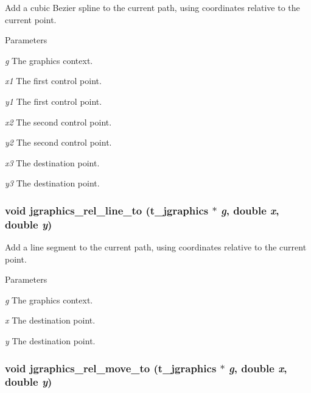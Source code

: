 Add a cubic Bezier spline to the current path, using coordinates relative to the current point. 
\begin{DoxyParams}{Parameters}
\item[{\em g}]The graphics context. \item[{\em x1}]The first control point. \item[{\em y1}]The first control point. \item[{\em x2}]The second control point. \item[{\em y2}]The second control point. \item[{\em x3}]The destination point. \item[{\em y3}]The destination point. \end{DoxyParams}
\hypertarget{group__jgraphics_ga0669af2caff03efea7fab31484ad62eb}{
\subsubsection[{jgraphics\_\-rel\_\-line\_\-to}]{\setlength{\rightskip}{0pt plus 5cm}void jgraphics\_\-rel\_\-line\_\-to ({\bf t\_\-jgraphics} $\ast$ {\em g}, \/  double {\em x}, \/  double {\em y})}}
\label{group__jgraphics_ga0669af2caff03efea7fab31484ad62eb}


Add a line segment to the current path, using coordinates relative to the current point. 
\begin{DoxyParams}{Parameters}
\item[{\em g}]The graphics context. \item[{\em x}]The destination point. \item[{\em y}]The destination point. \end{DoxyParams}
\hypertarget{group__jgraphics_ga1d3d4ea2e22dcb02098f1f24ff937296}{
\subsubsection[{jgraphics\_\-rel\_\-move\_\-to}]{\setlength{\rightskip}{0pt plus 5cm}void jgraphics\_\-rel\_\-move\_\-to ({\bf t\_\-jgraphics} $\ast$ {\em g}, \/  double {\em x}, \/  double {\em y})}}
\label{group__jgraphics_ga1d3d4ea2e22dcb02098f1f24ff937296}


